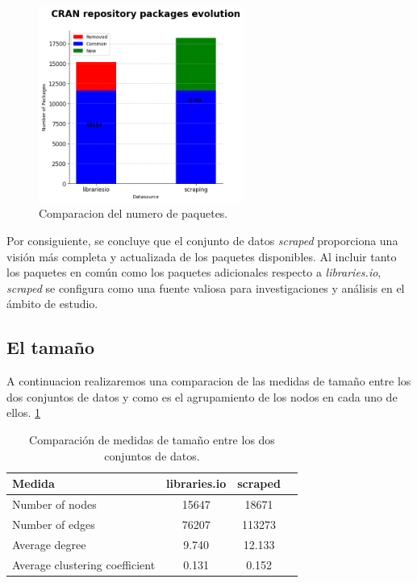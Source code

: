 \begin{figure}[h!]
    \begin{center}
        \includegraphics[width=0.6\textwidth]{img/cran/bars.png}
        \caption{Comparacion del numero de paquetes.}
        \label{fig:cran_common_packages3}
    \end{center}
\end{figure}

Por consiguiente, se concluye que el conjunto de datos \textit{scraped} proporciona una
visión más completa y actualizada de los paquetes disponibles. Al incluir tanto los paquetes
en común como los paquetes adicionales respecto a \textit{libraries.io}, \textit{scraped}
se configura como una fuente valiosa para investigaciones y análisis en el ámbito de estudio.






\subsection{El tamaño}

A continuacion realizaremos una comparacion de las medidas de tamaño entre los dos conjuntos de datos y como es
el agrupamiento de los nodos en cada uno de ellos. \ref{tab:cran_size}

\begin{table}[h!]
    \begin{center}
        \begin{tabular}{|l|c|c|c|}
            \hline
            \textbf{Medida}                & \textbf{libraries.io} & \textbf{scraped} \\
            \hline
            Number of nodes                & 15647                 & 18671            \\
            Number of edges                & 76207                 & 113273           \\
            Average degree                 & 9.740                 & 12.133           \\
            Average clustering coefficient & 0.131                 & 0.152            \\
            \hline
        \end{tabular}
        \caption{Comparación de medidas de tamaño entre los dos conjuntos de datos.}
        \label{tab:cran_size}
    \end{center}
\end{table}

